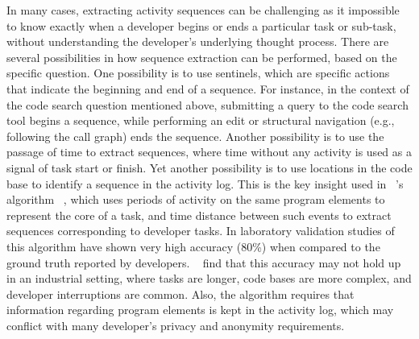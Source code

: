 In many cases, extracting activity sequences can be challenging as it impossible to know exactly when a developer begins or ends a particular task or sub-task, without understanding the developer's underlying thought process. There are several possibilities in how sequence extraction can be performed, based on the specific question. One possibility is to use sentinels, which are specific actions that indicate the beginning and end of a sequence. For instance, in the context of the code search question mentioned above, submitting a query to the code search tool begins a sequence, while performing an edit or structural navigation (e.g., following the call graph) ends the sequence. Another possibility is to use the passage of time to extract sequences, where time without any activity is used as a signal of task start or finish. Yet another possibility is to use locations in the code base to identify a sequence in the activity log. This is the key insight used in  ~'s algorithm ~\citeyear{Coman-TaskIdent}, which uses periods of activity on the same program elements to represent the core of a task, and time distance between such events to extract sequences corresponding to developer tasks. In laboratory validation studies of this algorithm have shown very high accuracy (80\%) when compared to the ground truth reported by developers. ~ find that this accuracy may not hold up in an industrial setting, where tasks are longer, code bases are more complex, and developer interruptions are common. Also, the algorithm requires that information regarding program elements is kept in the activity log, which may conflict with many developer's privacy and anonymity requirements.



